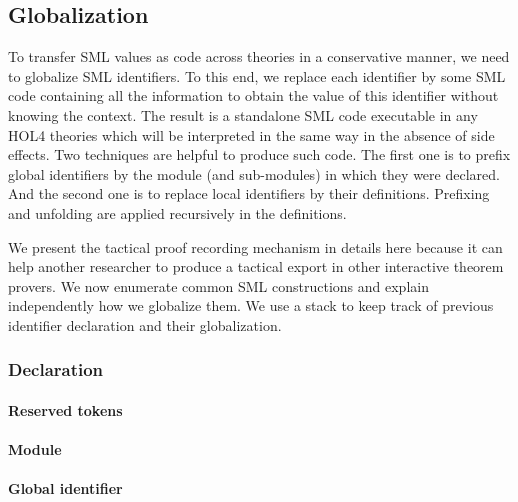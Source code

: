 \documentclass[runningheads,a4paper,draft]{svjour3}
\def\holfour{\textsf{HOL4}\xspace}
\def\sml{\textsf{SML}\xspace}
\begin{document}
\subsection{Globalization}
To transfer \sml values as code across theories in a conservative manner, we 
need to 
globalize \sml identifiers. To this end, we replace each identifier by some 
\sml code containing all the information to obtain the value of this identifier 
without knowing the context. The result is a standalone \sml code executable in 
any \holfour theories which will be interpreted in the same way in the absence 
of side effects. Two techniques are helpful to produce such code. The first one 
is to prefix global identifiers by the module (and sub-modules) in which they 
were declared. And the second one is to replace local identifiers 
by their definitions. Prefixing and 
unfolding are applied recursively in 
the definitions.

We present the tactical proof recording mechanism in details here because it 
can help 
another researcher to produce a tactical export in other interactive theorem 
provers.
We now enumerate common \sml constructions and explain 
independently how we globalize them. We use a stack to keep track of previous 
identifier declaration and their globalization.



\subsubsection{Declaration}

\paragraph{Reserved tokens}


\paragraph{Module}



\paragraph{Global identifier}
\end{document}
